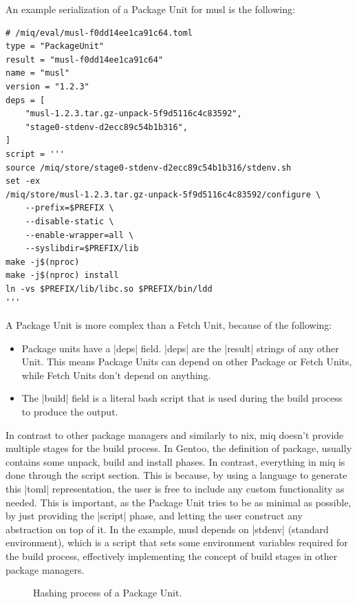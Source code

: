 An example serialization of a Package Unit for musl is the
following:

\begin{verbatim}
# /miq/eval/musl-f0dd14ee1ca91c64.toml
type = "PackageUnit"
result = "musl-f0dd14ee1ca91c64"
name = "musl"
version = "1.2.3"
deps = [
    "musl-1.2.3.tar.gz-unpack-5f9d5116c4c83592",
    "stage0-stdenv-d2ecc89c54b1b316",
]
script = '''
source /miq/store/stage0-stdenv-d2ecc89c54b1b316/stdenv.sh
set -ex
/miq/store/musl-1.2.3.tar.gz-unpack-5f9d5116c4c83592/configure \
    --prefix=$PREFIX \
    --disable-static \
    --enable-wrapper=all \
    --syslibdir=$PREFIX/lib
make -j$(nproc)
make -j$(nproc) install
ln -vs $PREFIX/lib/libc.so $PREFIX/bin/ldd
'''
\end{verbatim}

A Package Unit is more complex than a Fetch Unit, because of
the following:
\begin{itemize}
    \item Package units have a |deps| field. |deps| are the
    |result| strings of any other Unit. This means Package
    Units can depend on other Package or Fetch Units, while
    Fetch Units don't depend on anything.
    \item The |build| field is a literal bash script that is
    used during the build process to produce the output.
\end{itemize}

In contrast to other package managers and similarly to nix,
miq doesn't provide multiple stages for the build process.
In Gentoo, the definition of package, usually contains some
unpack, build and install phases. In contrast, everything in
miq is done through the script section. This is because, by
using a language to generate this |toml| representation, the
user is free to include any custom functionality as needed.
This is important, as the Package Unit tries to be as
minimal as possible, by just providing the |script| phase,
and letting the user construct any abstraction on top of it.
In the example, musl depends on |stdenv| (standard environment), which is a script
that sets some environment variables required for the build
process, effectively implementing the concept of build
stages in other package managers.

\begin{figure}[hbt]
    \centerfloat
    
    \caption{Hashing process of a Package Unit.}
    \label{fig:pkg_hash}
\end{figure}

